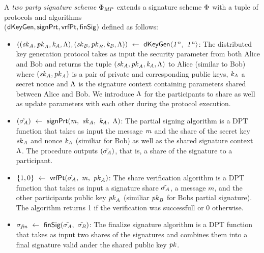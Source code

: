 \begin{definition}
    \label{def:twoPartySig}

    A \emph{two party signature scheme $\Phi_{\mathit{MP}}$} extends a signature scheme $\Phi$ with a tuple of protocols and algorithms\\
    ($\mathsf{dKeyGen}, \mathsf{signPrt} , \mathsf{vrfPt}, \mathsf{finSig})$ defined as follows:

    \begin{itemize}
        \item $((\mathit{sk}_{\mathit{A}}, \mathit{pk}_{\mathit{A}}, \mathit{\mathit{k}_{\mathit{A}}}, \Lambda), (\mathit{sk}_{\mathit{B}}, \mathit{pk}_{\mathit{B}}, \mathit{\mathit{k}_{\mathit{B}}}, \Lambda)) ~\leftarrow~ \mathsf{dKeyGen}\langle \mathit{1^n} ,~ \mathit{1^n} \rangle$: The distributed key generation protocol takes as input the security parameter from both Alice and Bob and returns
        the tuple $(\mathit{sk}_{\mathit{A}}, \mathit{pk}_{\mathit{A}}, \mathit{\mathit{k}_{\mathit{A}}}, \Lambda)$ to Alice (similar to Bob) where $(\mathit{sk}_{\mathit{A}}, \mathit{pk}_{\mathit{A}})$ is a pair of private and corresponding public keys, $\mathit{\mathit{k}_{\mathit{A}}}$ a secret nonce and $\Lambda$ is the signature context containing parameters shared between Alice and Bob.
        We introduce $\Lambda$ for the participants to share as well as update parameters with each other during the protocol execution.

        \item $(\tilde{\sigma_{\mathit{A}}}) ~\leftarrow~ \mathsf{signPrt}(\mathit{m} ,~ \mathit{sk}_{\mathit{A}} ,~ \mathit{\mathit{k}_{\mathit{A}}} ,~ \Lambda)$: The partial signing algorithm is a DPT function that takes as input the message $\mathit{m}$ and the share of the secret key $\mathit{sk}_{\mathit{A}}$ and nonce $\mathit{\mathit{k}_{\mathit{A}}}$ (similiar for Bob) as well
        as the shared signature context $\Lambda$. The procedure outputs $(\tilde{\sigma_{\mathit{A}}})$, that is, a share of the signature to a participant.

        \item $\{1,0\} ~\leftarrow~ \mathsf{vrfPt}(\tilde{\sigma_{\mathit{A}}} ,~ \mathit{m} ,~ \mathit{pk}_{\mathit{A}})$: The share verification algorithm is a DPT function that takes as input a signature share $\tilde{\sigma_{\mathit{A}}}$, a message $m$, and the other participants public key $\mathit{pk}_{\mathit{A}}$ (similiar $\mathit{pk}_{\mathit{B}}$ for Bobs partial signature). The algorithm returns 1 if the verification was successfull or 0 otherwise.

        \item $\sigma_{\mathit{fin}} ~\leftarrow~ \mathsf{finSig}(\tilde{\sigma_{\mathit{A}}} ,~ \tilde{\sigma_{\mathit{B}}})$: The finalize signature algorithm is a DPT function that takes as input two shares of the signatures and combines them into a final signature valid ander the shared public key $\mathit{pk}$.

    \end{itemize}

\end{definition}

